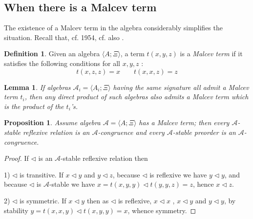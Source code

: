 \documentclass[11pt,a4paper]{article}
\newtheorem{proposition}[theorem]{Proposition}
\newtheorem{lemma}[theorem]{Lemma}
\theoremstyle{definition} %
\newtheorem{definition}[theorem]{Definition}
\newcommand\+[1]{\mathcal{#1}} %
\begin{document}


\subsection{ When there is a Malcev term}
\label{ss:when there is a group operation}

The existence of a Malcev term in the algebra considerably simplifies the situation. Recall that, cf.  \cite{malcev} 1954, cf. also \cite{nlab}.
\begin{definition}\label{def Malcev}
Given an algebra $\langle A;\Xi\rangle$, a term $t(x,y,z)$
is a {\em Malcev term} if it satisfies the following conditions for all   $x,y,z$ :
\begin{equation*}\label{eq Malcev}
t(x,z,z)=x \qquad t(x,x,z)=z
\end{equation*}
\end{definition}
%
\begin{lemma}\label{l Malcev}
If algebras $\+A_i = \langle A_i; \Xi \rangle$ having the same signature all admit a Malcev term $t_i$, then any  direct product of such algebras also admits a Malcev term which is the product of the $t_i$'s.
\end{lemma}
%
\begin{proposition}\label{p Malcev}
Assume algebra  $\+A = \langle A; \Xi \rangle$ has  a Malcev term; then every $\+A$-stable reflexive relation is an $\+A$-congruence and every $\+A$-stable 
preorder is an $\+A$-congruence.
\end{proposition}
%
\begin{proof}
If $\triangleleft$ is an $\+A$-stable reflexive relation then 

1) $\triangleleft$ is transitive. If 
 $x \triangleleft y$ and $y \triangleleft z$, because  $\triangleleft$ is  reflexive we have
 $y \triangleleft y$, and because  $\triangleleft$ is  $\+A$-stable we have
 $x=t(x,y,y) \triangleleft t(y,y,z)=z$, hence $x \triangleleft z$.
 
2) $\triangleleft$ is symmetric. If $x \triangleleft y$ then as $\triangleleft$ is  reflexive, $x \triangleleft x$ , $x \triangleleft y$ and $y \triangleleft y$,
by stability $y=t(x,x,y)\triangleleft t(x,y,y)=x$, whence symmetry.
\end{proof}
\end{document}
